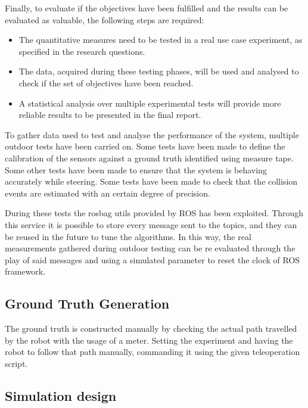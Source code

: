 Finally, to evaluate if the objectives have been fulfilled and the results can be evaluated as valuable, the following steps are required:
\begin{itemize}
	\item The quantitative measures need to be tested in a real use case experiment, as specified in the research questions.
	\item The data, acquired during these testing phases, will be used and analysed to check if the set of objectives have been reached.
	\item A statistical analysis over multiple experimental tests will provide more reliable results to be presented in the final report.
\end{itemize}


To gather data used to test and analyse the performance of the system, multiple outdoor tests have been carried on.
Some tests have been made to define the calibration of the sensors against a ground truth identified using measure tape.
Some other tests have been made to ensure that the system is behaving accurately while steering.
Some tests have been made to check that the collision events are estimated with an certain degree of precision.

During these tests the rosbag utils provided by ROS has been exploited. Through this service it is possible to store every message sent to the topics, and they can be reused in the future to tune the algorithms.
In this way, the real measurements gathered during outdoor testing can be re evaluated through the play of said messages and using a simulated parameter to reset the clock of ROS framework.



\subsection{Ground Truth Generation} 
\label{sec:gt}

\noindent The ground truth is constructed manually by checking the actual path travelled by the robot with the usage of a meter. Setting the experiment and having the robot to follow that path manually, commanding it using the given teleoperation script.


\subsection{Simulation design}
\label{sec:simDesign}

